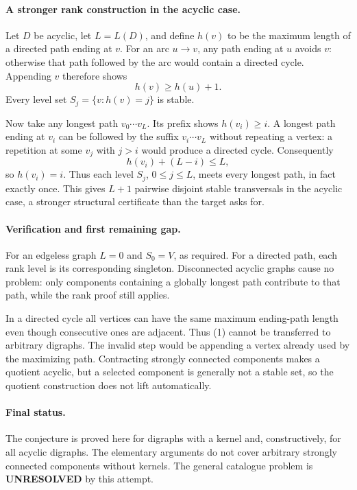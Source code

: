 \documentclass[11pt,a4paper]{article}
\begin{document}
\paragraph{A stronger rank construction in the acyclic case.}
Let $D$ be acyclic, let $L=L(D)$, and define $h(v)$ to be the maximum length of a directed path ending at $v$. For an arc $u\to v$, any path ending at $u$ avoids $v$: otherwise that path followed by the arc would contain a directed cycle. Appending $v$ therefore shows
\[
 h(v)\ge h(u)+1. \tag{1}
\]
Every level set $S_j=\{v:h(v)=j\}$ is stable.

Now take any longest path $v_0\cdots v_L$. Its prefix shows $h(v_i)\ge i$. A longest path ending at $v_i$ can be followed by the suffix $v_i\cdots v_L$ without repeating a vertex: a repetition at some $v_j$ with $j>i$ would produce a directed cycle. Consequently
\[
 h(v_i)+(L-i)\le L,
\]
so $h(v_i)=i$. Thus each level $S_j$, $0\le j\le L$, meets every longest path, in fact exactly once. This gives $L+1$ pairwise disjoint stable transversals in the acyclic case, a stronger structural certificate than the target asks for.

\paragraph{Verification and first remaining gap.}
For an edgeless graph $L=0$ and $S_0=V$, as required. For a directed path, each rank level is its corresponding singleton. Disconnected acyclic graphs cause no problem: only components containing a globally longest path contribute to that path, while the rank proof still applies.

In a directed cycle all vertices can have the same maximum ending-path length even though consecutive ones are adjacent. Thus (1) cannot be transferred to arbitrary digraphs. The invalid step would be appending a vertex already used by the maximizing path. Contracting strongly connected components makes a quotient acyclic, but a selected component is generally not a stable set, so the quotient construction does not lift automatically.

\paragraph{Final status.}
The conjecture is proved here for digraphs with a kernel and, constructively, for all acyclic digraphs. The elementary arguments do not cover arbitrary strongly connected components without kernels. The general catalogue problem is \textbf{UNRESOLVED} by this attempt.
\end{document}

